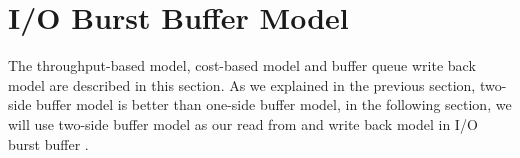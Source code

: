\section{I/O Burst Buffer Model}
\label{sec:model}

The throughput-based model, cost-based model and buffer queue write back model are described in this section.
As we explained in the previous section, two-side buffer model is better than one-side buffer model, in the following section, we will use two-side buffer model as our read from and write back model in I/O burst buffer
.

